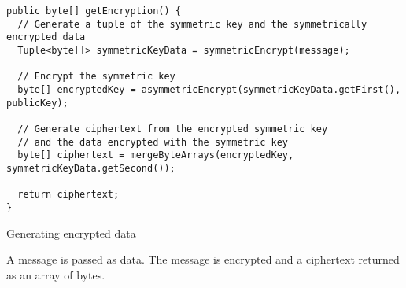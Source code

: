 \begin{listing}[H]
  \centering
  \begin{verbatim}
public byte[] getEncryption() {
  // Generate a tuple of the symmetric key and the symmetrically encrypted data
  Tuple<byte[]> symmetricKeyData = symmetricEncrypt(message);

  // Encrypt the symmetric key
  byte[] encryptedKey = asymmetricEncrypt(symmetricKeyData.getFirst(), publicKey);

  // Generate ciphertext from the encrypted symmetric key
  // and the data encrypted with the symmetric key
  byte[] ciphertext = mergeByteArrays(encryptedKey, symmetricKeyData.getSecond());

  return ciphertext;
}
  \end{verbatim}
  \caption{
  	Generating encrypted data
  }{
  	A message is passed as data. The message is encrypted and a ciphertext returned as an array of bytes.
  }
  \label{code:encrypt_data}
\end{listing}
